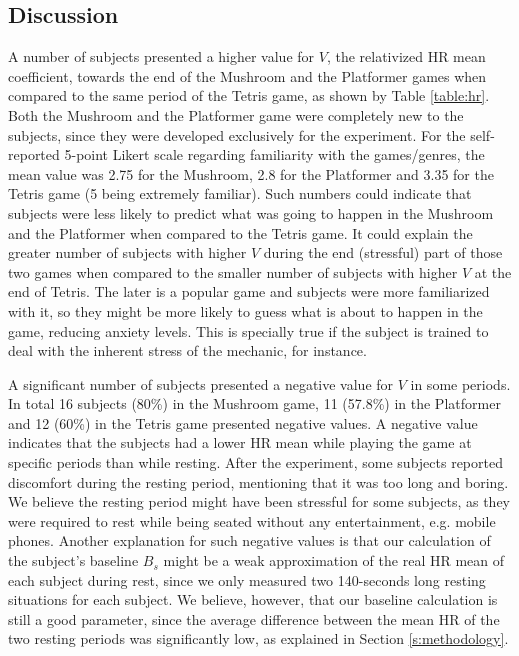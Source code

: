 \subsection{Discussion}

A number of subjects presented a higher value for $V$, the relativized HR mean coefficient, towards the end of the Mushroom and the Platformer games when compared to the same period of the Tetris game, as shown by Table \ref{table:hr}. Both the Mushroom and the Platformer game were completely new to the subjects, since they were developed exclusively for the experiment. For the self-reported 5-point Likert scale regarding familiarity with the games/genres, the mean value was 2.75 for the Mushroom, 2.8 for the Platformer and 3.35 for the Tetris game (5 being extremely familiar). Such numbers could indicate that subjects were less likely to predict what was going to happen in the Mushroom and the Platformer when compared to the Tetris game. It could explain the greater number of subjects with higher $V$ during the end (stressful) part of those two games when compared to the smaller number of subjects with higher $V$ at the end of Tetris. The later is a popular game and subjects were more familiarized with it, so they might be more likely to guess what is about to happen in the game, reducing anxiety levels. This is specially true if the subject is trained to deal with the inherent stress of the mechanic, for instance.

A significant number of subjects presented a negative value for $V$ in some periods. In total 16 subjects (80\%) in the Mushroom game, 11 (57.8\%) in the Platformer and 12 (60\%) in the Tetris game presented negative values. A negative value indicates that the subjects had a lower HR mean while playing the game at specific periods than while resting. After the experiment, some subjects reported discomfort during the resting period, mentioning that it was too long and boring. We believe the resting period might have been stressful for some subjects, as they were required to rest while being seated without any entertainment, e.g. mobile phones. Another explanation for such negative values is that our calculation of the subject's baseline $B_s$ might be a weak approximation of the real HR mean of each subject during rest, since we only measured two 140-seconds long resting situations for each subject. We believe, however, that our baseline calculation is still a good parameter, since the average difference between the mean HR of the two resting periods was significantly low, as explained in Section \ref{s:methodology}.

